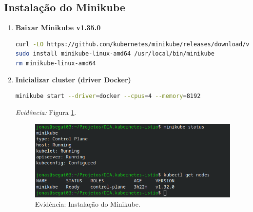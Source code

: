 \documentclass[9pt,a4paper,twocolumn,twoside]{tau-class/tau}
\begin{document}
\subsection{Instalação do Minikube}
\begin{enumerate}[label=\arabic*.]
\item\textbf{Baixar Minikube v1.35.0} \cite{minikube}

\begin{lstlisting}[language=Bash]
curl -LO https://github.com/kubernetes/minikube/releases/download/v1.35.0/minikube-linux-amd64
sudo install minikube-linux-amd64 /usr/local/bin/minikube
rm minikube-linux-amd64
\end{lstlisting}

\item\textbf{Inicializar cluster (driver Docker)}
\begin{lstlisting}[language=Bash]
minikube start --driver=docker --cpus=4 --memory=8192
\end{lstlisting}
\textit{Evidência:} Figura \ref{fig:minikube}.\\

\begin{figure}[h]
    \centering
    \includegraphics[width=1\linewidth]{figures/evidence-minikube.png}
    \caption{Evidência: Instalação do Minikube.}
    \label{fig:minikube}
\end{figure}
\end{enumerate}
\end{document}
